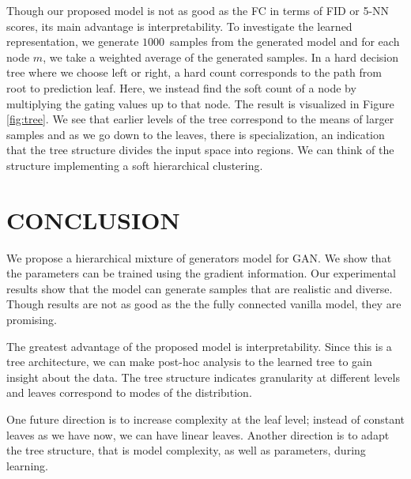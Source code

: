 \documentclass[a4paper,onesided,12pt]{report}
\begin{document}
Though our proposed model is not as good as the FC in terms of FID or 5-NN scores, its main advantage is interpretability. To investigate the learned representation, we generate $1000$~samples from the generated model and for each node $m$, we take a weighted average of the generated samples. In a hard decision tree where we choose left or right, a hard count corresponds to the path from root to prediction leaf. Here, we instead find the soft count of a node by multiplying the gating values up to that node. The result is visualized in Figure \ref{fig:tree}. We see that earlier levels of the tree correspond to the means of larger samples and as we go down to the leaves, there is specialization, an indication that the tree structure divides the input space into regions. We can think of the structure implementing a soft hierarchical clustering. 

\chapter{CONCLUSION}
\label{chapter:conclusion}
We propose a hierarchical mixture of generators model for GAN. We show that the parameters can be trained using the gradient information. Our experimental results show that the model can generate samples that are realistic and diverse. Though results are not as good as the the fully connected vanilla model, they are promising.

The greatest advantage of the proposed model is interpretability. Since this is a tree architecture, we can make post-hoc analysis to the learned tree to gain insight about the data. The tree structure indicates granularity at different levels and leaves correspond to modes of the distribıtion.

One future direction is to increase complexity at the leaf level; instead of constant leaves as we have now, we can have linear leaves. Another direction is to adapt the tree structure, that is model complexity, as well as parameters, during learning.



\end{document}
